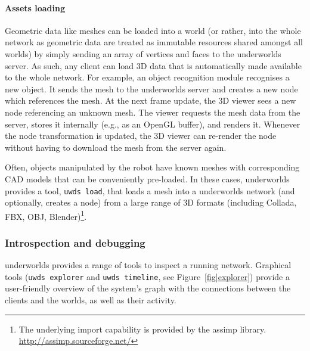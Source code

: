\documentclass[letterpaper, 10pt, conference]{ieeeconf}
\newcommand{\eg}{e.g.,\xspace}
\newcommand{\uwds}{{\sc underworlds}\xspace}
\begin{document}
\paragraph*{Assets loading}

Geometric data like meshes can be loaded into a world (or rather, into the whole
network as geometric data are treated as immutable resources shared amongst all
worlds) by simply sending an array of vertices and faces to the \uwds server.
As such, any client can load 3D data that is automatically made available to the
whole network. For example, an object recognition module recognises a new
object. It sends the mesh to the \uwds server and creates a new node which
references the mesh. At the next frame update, the 3D viewer sees a new node
referencing an unknown mesh. The viewer requests the mesh data from the
server, stores it internally (\eg as an OpenGL buffer), and renders it. Whenever
the node transformation is updated, the 3D viewer can re-render the node without
having to download the mesh from the server again.

Often, objects manipulated by the robot have known meshes with corresponding CAD
models that can be conveniently pre-loaded. In these cases, \uwds provides a
tool, {\tt uwds load}, that loads a mesh into a \uwds network (and optionally,
creates a node) from a large range of 3D formats (including Collada, FBX, OBJ,
Blender)\footnote{The underlying import
capability is provided by the {\sc assimp} library.
\url{http://assimp.sourceforge.net/}}.

\subsubsection{Introspection and debugging}

\uwds provides a range of tools to inspect a running network. Graphical
tools ({\tt uwds explorer} and {\tt uwds timeline}, see Figure~\ref{fig|explorer})
provide a user-friendly overview of the system's graph with the connections
between the clients and the worlds, as well as their activity.
\end{document}

